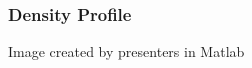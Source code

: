\documentclass{beamer}
\begin{document}
        \begin{frame}
            \frametitle{Density Profile}

                {Image created by presenters in Matlab}

        \end{frame}
\end{document}
